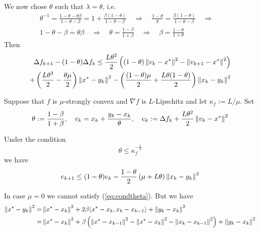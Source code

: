 \documentclass[english,12pt,a4paper]{article}
\begin{document}
%
We now chose $\theta$ such that $\lambda=\theta$, i.e.
%
\begin{align*}
\theta^{-1} = \frac{1-\theta-\theta\beta}{1-\theta-\beta} = 1  + \frac{\beta(1-\theta)}{1-\theta-\beta}\quad\Rightarrow\quad 
\frac{1-\theta}{\theta} = \frac{\beta(1-\theta)}{1-\theta-\beta}\quad\Rightarrow\quad \\
1-\theta-\beta = \theta\beta\quad\Rightarrow\quad 
\theta = \frac{1-\beta}{1+\beta} \quad\Rightarrow\quad \beta = \frac{1-\theta}{1+\theta}
\end{align*}
%
Then
%
\begin{align*}
\Delta f_{k+1} -(1-\theta)\Delta f_k \le  \frac{L\theta^2}{2}\left( (1-\theta)\left\|v_k -x^*\right\|^2 - \left\|v_{k+1}-x^*\right\|^2\right)\\
 + \left( \frac{L\theta^3}{2} - \frac{\theta\mu}{2}\right)\left\|x^*-y_k\right\|^2 -\left(\frac{(1-\theta)\mu}{2}+\frac{L\theta(1-\theta)}{2}\right)\left\|x_k-y_k\right\|^2
\end{align*}
%
\begin{proposition}\label{prop:}
Suppose that $f$ is $\mu$-strongly convex and $\nabla f$ is $L$-Lipschitz and let $\kappa_f:=L/\mu$. Set
\begin{equation}\label{eq:}
\theta := \frac{1-\beta}{1+\beta},\quad v_k = x_k + \frac{y_k-x_k}{\theta},\quad e_k := \Delta f_k + \frac{L\theta^2}{2}\left\|v_k -x^*\right\|^2
\end{equation}

Under the condition
%
\begin{equation}\label{eq:condtheta}
\theta \le \kappa_f^{-\frac12}
\end{equation}
%
we have
%
\begin{equation}\label{eq:}
e_{k+1} \le (1-\theta) e_k  -\frac{1-\theta}{2}\left(\mu + L\theta\right)\left\|x_k-y_k\right\|^2
\end{equation}
%
\end{proposition}
%

In case $\mu=0$ we cannot satisfy (\ref{eq:condtheta}). But we have
\begin{align*}
\left\|x^*-y_k\right\|^2 =& \left\|x^*-x_k\right\|^2 + 2\beta\langle x^*-x_k,x_k-x_{k-1}\rangle +  \left\|y_k-x_k\right\|^2 \\
=& \left\|x^*-x_k\right\|^2 + \beta\left( \left\|x^*-x_{k-1}\right\|^2 - \left\|x^*-x_k\right\|^2 - \left\|x_k-x_{k-1}\right\|^2 \right) +  \left\|y_k-x_k\right\|^2
\end{align*}
\end{document}
